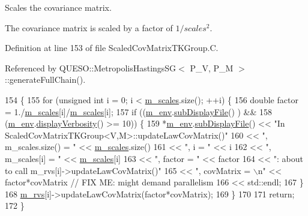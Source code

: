 Scales the covariance matrix. 

The covariance matrix is scaled by a factor of $ 1/scales^2 $. 

Definition at line 153 of file Scaled\-Cov\-Matrix\-T\-K\-Group.\-C.



Referenced by Q\-U\-E\-S\-O\-::\-Metropolis\-Hastings\-S\-G$<$ P\-\_\-\-V, P\-\_\-\-M $>$\-::generate\-Full\-Chain().


\begin{DoxyCode}
154 \{
155   \textcolor{keywordflow}{for} (\textcolor{keywordtype}{unsigned} \textcolor{keywordtype}{int} i = 0; i < \hyperlink{class_q_u_e_s_o_1_1_base_t_k_group_ad36d4dc6f4812e3e10d8090f0dbb9e40}{m\_scales}.size(); ++i) \{
156     \textcolor{keywordtype}{double} factor = 1./\hyperlink{class_q_u_e_s_o_1_1_base_t_k_group_ad36d4dc6f4812e3e10d8090f0dbb9e40}{m\_scales}[i]/\hyperlink{class_q_u_e_s_o_1_1_base_t_k_group_ad36d4dc6f4812e3e10d8090f0dbb9e40}{m\_scales}[i];
157     \textcolor{keywordflow}{if} ((\hyperlink{class_q_u_e_s_o_1_1_base_t_k_group_a2bce5e8aa5c844d4332a0e73cf00a1f9}{m\_env}.\hyperlink{class_q_u_e_s_o_1_1_base_environment_a8a0064746ae8dddfece4229b9ad374d6}{subDisplayFile}()        ) &&
158         (\hyperlink{class_q_u_e_s_o_1_1_base_t_k_group_a2bce5e8aa5c844d4332a0e73cf00a1f9}{m\_env}.\hyperlink{class_q_u_e_s_o_1_1_base_environment_a1fe5f244fc0316a0ab3e37463f108b96}{displayVerbosity}() >= 10)) \{
159       *\hyperlink{class_q_u_e_s_o_1_1_base_t_k_group_a2bce5e8aa5c844d4332a0e73cf00a1f9}{m\_env}.\hyperlink{class_q_u_e_s_o_1_1_base_environment_a8a0064746ae8dddfece4229b9ad374d6}{subDisplayFile}() << \textcolor{stringliteral}{"In ScaledCovMatrixTKGroup<V,M>::updateLawCovMatrix()"}
160                               << \textcolor{stringliteral}{", m\_scales.size() = "} << \hyperlink{class_q_u_e_s_o_1_1_base_t_k_group_ad36d4dc6f4812e3e10d8090f0dbb9e40}{m\_scales}.size()
161                               << \textcolor{stringliteral}{", i = "}               << i
162                               << \textcolor{stringliteral}{", m\_scales[i] = "}     << \hyperlink{class_q_u_e_s_o_1_1_base_t_k_group_ad36d4dc6f4812e3e10d8090f0dbb9e40}{m\_scales}[i]
163                               << \textcolor{stringliteral}{", factor = "}          << factor
164                               << \textcolor{stringliteral}{": about to call m\_rvs[i]->updateLawCovMatrix()"}
165                               << \textcolor{stringliteral}{", covMatrix = \(\backslash\)n"} << factor*covMatrix \textcolor{comment}{// FIX ME: might demand parallelism}
166                               << std::endl;
167     \}
168     \hyperlink{class_q_u_e_s_o_1_1_base_t_k_group_a87c6b02ea45ab3de634c22afa58f53a5}{m\_rvs}[i]->updateLawCovMatrix(factor*covMatrix);
169   \}
170 
171   \textcolor{keywordflow}{return};
172 \}
\end{DoxyCode}


